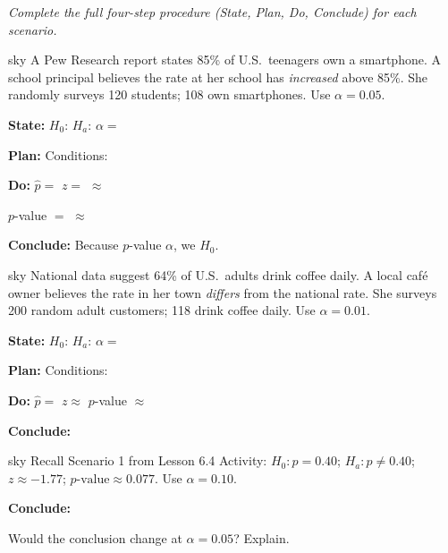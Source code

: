 \documentclass[10pt]{article}
\begin{document}
\namepartnerperiod

\vspace{0.15in}

\textit{Complete the full four-step procedure (State, Plan, Do, Conclude) for each scenario.}

\begin{scenariobox}{sky}
A Pew Research report states 85\% of U.S.\ teenagers own a smartphone. A school principal
believes the rate at her school has \emph{increased} above 85\%. She randomly surveys 120
students; 108 own smartphones. Use $\alpha = 0.05$.

\textbf{State:} $H_0$: \blank{4cm} \quad $H_a$: \blank{4cm} \quad $\alpha = $ \blank{1.5cm}

\textbf{Plan:} Conditions: 

\textbf{Do:} $\hat p = $ \blank{2cm} \quad $z = $ \blank{5cm} $\approx$ \blank{2cm}

$p$-value $=$ \blank{5cm} $\approx$ \blank{2cm}

\textbf{Conclude:} Because $p$-value \blank{1cm} $\alpha$, we \blank{3cm} $H_0$.
\end{scenariobox}

\begin{scenariobox}{sky}
National data suggest 64\% of U.S.\ adults drink coffee daily. A local café owner believes
the rate in her town \emph{differs} from the national rate. She surveys 200 random adult
customers; 118 drink coffee daily. Use $\alpha = 0.01$.

\textbf{State:} $H_0$: \blank{4cm} \quad $H_a$: \blank{4cm} \quad $\alpha = $ \blank{1.5cm}

\textbf{Plan:} Conditions: 

\textbf{Do:} $\hat p = $ \blank{2cm} \quad $z \approx$ \blank{2cm} \quad $p$-value $\approx$ \blank{2cm}

\textbf{Conclude:} 
\end{scenariobox}

\begin{scenariobox}{sky}
Recall Scenario 1 from Lesson 6.4 Activity: $H_0: p=0.40$; $H_a: p\ne0.40$; $z\approx-1.77$;
$p\text{-value}\approx0.077$. Use $\alpha=0.10$.

\textbf{Conclude:} 

Would the conclusion change at $\alpha=0.05$? Explain.
\end{scenariobox}
\end{document}
